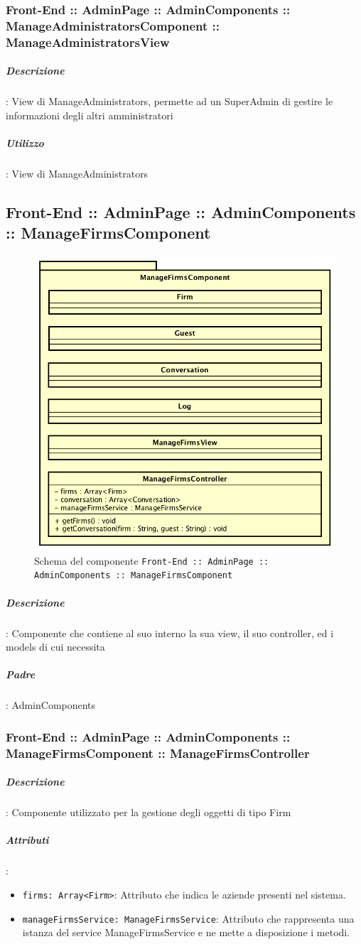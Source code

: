 \documentclass[../ManualeSviluppatore_v2.0.0.tex]{subfiles}
\begin{document}
				\subsubsection{Front-End :: AdminPage :: AdminComponents :: ManageAdministratorsComponent :: ManageAdministratorsView}
					\subparagraph{Descrizione}: View di ManageAdministrators, permette ad un SuperAdmin di gestire le informazioni degli altri amministratori
					\subparagraph{Utilizzo}: View di ManageAdministrators

	\newpage
	\subsection{Front-End :: AdminPage :: AdminComponents :: ManageFirmsComponent}
	\begin{figure}[!h]
		\centering
		\includegraphics[scale=0.6]{Architettura/Front-End/AdminPage/AdminComponents/ManageFirmsComponent.png}
		\caption{Schema del componente \texttt{Front-End :: AdminPage :: AdminComponents :: ManageFirmsComponent}}
	\end{figure}

			\subparagraph{Descrizione}: Componente che contiene al suo interno la sua view, il suo controller, ed i models di cui necessita
			\subparagraph{Padre}: AdminComponents
				\subsubsection{Front-End :: AdminPage :: AdminComponents :: ManageFirmsComponent :: ManageFirmsController}
					\subparagraph{Descrizione}: Componente utilizzato per la gestione degli oggetti di tipo Firm
					\subparagraph{Attributi}:
					\begin{itemize}
						\item \texttt{firms: Array<Firm>}: Attributo che indica le aziende presenti nel sistema.
						\item \texttt{manageFirmsService: ManageFirmsService}: Attributo che rappresenta una istanza del service ManageFirmsService e ne mette a disposizione i metodi.
					\end{itemize}
\end{document}
